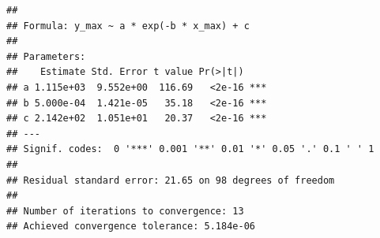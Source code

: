 \documentclass[
]{article}
\newenvironment{Shaded}{\begin{snugshade}}{\end{snugshade}}
\newcommand{\AttributeTok}[1]{\textcolor[rgb]{0.13,0.29,0.53}{#1}}
\newcommand{\DecValTok}[1]{\textcolor[rgb]{0.00,0.00,0.81}{#1}}
\newcommand{\FloatTok}[1]{\textcolor[rgb]{0.00,0.00,0.81}{#1}}
\newcommand{\FunctionTok}[1]{\textcolor[rgb]{0.13,0.29,0.53}{\textbf{#1}}}
\newcommand{\NormalTok}[1]{#1}
\newcommand{\OtherTok}[1]{\textcolor[rgb]{0.56,0.35,0.01}{#1}}
\newcommand{\SpecialCharTok}[1]{\textcolor[rgb]{0.81,0.36,0.00}{\textbf{#1}}}
\begin{document}
\begin{Shaded}
\end{Shaded}

\begin{verbatim}
## 
## Formula: y_max ~ a * exp(-b * x_max) + c
## 
## Parameters:
##    Estimate Std. Error t value Pr(>|t|)    
## a 1.115e+03  9.552e+00  116.69   <2e-16 ***
## b 5.000e-04  1.421e-05   35.18   <2e-16 ***
## c 2.142e+02  1.051e+01   20.37   <2e-16 ***
## ---
## Signif. codes:  0 '***' 0.001 '**' 0.01 '*' 0.05 '.' 0.1 ' ' 1
## 
## Residual standard error: 21.65 on 98 degrees of freedom
## 
## Number of iterations to convergence: 13 
## Achieved convergence tolerance: 5.184e-06
\end{verbatim}
\end{document}
